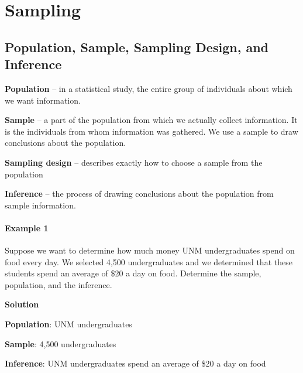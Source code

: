 \chapter{Sampling}

\section{Population, Sample, Sampling Design, and Inference}

\noindent \textbf{Population} – in a statistical study, the entire group of individuals about which we want information.

\vspace{0.2cm}

\noindent \textbf{Sample} – a part of the population from which we actually collect information. It is the individuals from whom information was gathered. We use a sample to draw conclusions about the population.

\vspace{0.2cm}

\noindent \textbf{Sampling design} – describes exactly how to choose a sample from the population

\vspace{0.2cm}

\noindent \textbf{Inference} – the process of drawing conclusions about the population from sample information.

\subsubsection*{Example 1}
Suppose we want to determine how much money UNM undergraduates spend on food every day. We selected 4,500 undergraduates and we determined that these students spend an average of \$20 a day on food. Determine the sample, population, and the inference. 

\vspace{0.2cm}

\textbf{Solution}

\vspace{0.2cm}

\noindent \textbf{Population}: UNM undergraduates

\vspace{0.2cm}

\noindent \textbf{Sample}: 4,500 undergraduates

\vspace{0.2cm}

\noindent \textbf{Inference}: UNM undergraduates spend an average of \$20 a day on food

